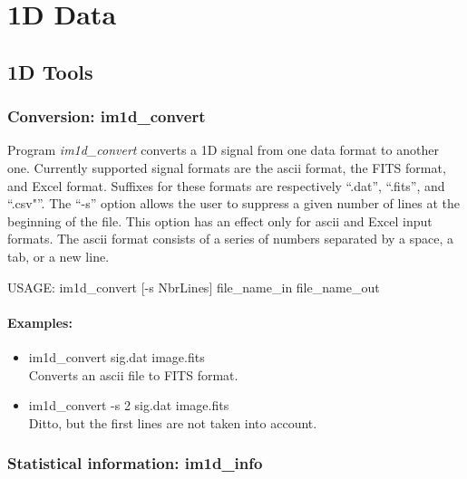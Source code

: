 \chapter{\proj 1D Data}
\label{ch_1d}


\section{1D Tools}
\subsection{Conversion: im1d\_convert}
Program {\em im1d\_convert} converts a 1D signal from one data format 
to another one. 
Currently supported signal formats are the ascii format, the FITS format, 
  and Excel format. Suffixes for these formats are 
respectively ``.dat'', ``.fits'',
  and ``.csv"''. The ``-s'' option allows the user to 
suppress a given number
  of lines at the beginning of the file. This option has an effect only  
  for ascii and Excel input formats. The ascii format consists of a series of
  numbers separated by a space, a tab, or a new line.
{\bf
\begin{center}
     USAGE: im1d\_convert [-s NbrLines] file\_name\_in file\_name\_out
\end{center}}
\subsubsection*{Examples:}
\begin{itemize}
\item im1d\_convert sig.dat image.fits \\
Converts an ascii file to FITS format.
\item im1d\_convert -s 2 sig.dat image.fits  \\
Ditto, but the first lines are not taken into account.
\end{itemize}


\subsection{Statistical information: im1d\_info}

